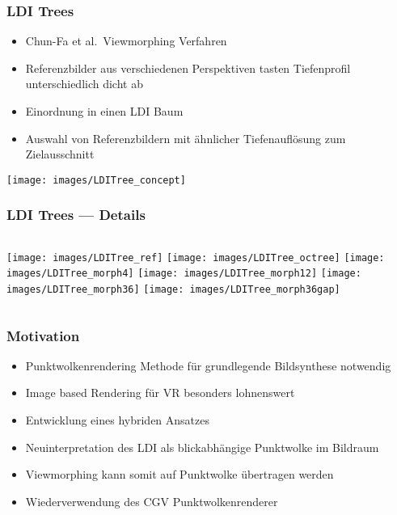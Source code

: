 \documentclass[aspectratio=169]{beamer}
\begin{document}
\begin{frame}
    \frametitle{LDI Trees}
    \begin{itemize}
        \item Chun-Fa et al.\ Viewmorphing Verfahren
        \item Referenzbilder aus verschiedenen Perspektiven tasten Tiefenprofil unterschiedlich dicht ab
        \item Einordnung in einen LDI Baum
        \item Auswahl von Referenzbildern mit ähnlicher Tiefenauflösung zum Zielausschnitt
    \end{itemize}
    \texttt{[image: images/LDITree\_concept]}
\end{frame}

\begin{frame}
    \frametitle{LDI Trees --- Details}
    \begin{columns}
        \centering
        \texttt{[image: images/LDITree\_ref]}
        \texttt{[image: images/LDITree\_octree]}
        \centering
        \texttt{[image: images/LDITree\_morph4]}
        \texttt{[image: images/LDITree\_morph12]}
        \centering
        \texttt{[image: images/LDITree\_morph36]}
        \texttt{[image: images/LDITree\_morph36gap]}
    \end{columns}
\end{frame}

\begin{frame}
    \frametitle{Motivation}
    \begin{itemize}
        \item Punktwolkenrendering Methode für grundlegende Bildsynthese notwendig
        \item Image based Rendering für VR besonders lohnenswert
        \item Entwicklung eines hybriden Ansatzes
        \item Neuinterpretation des LDI als blickabhängige Punktwolke im Bildraum
        \item Viewmorphing kann somit auf Punktwolke übertragen werden
        \item Wiederverwendung des CGV Punktwolkenrenderer
    \end{itemize}
\end{frame}
\end{document}
